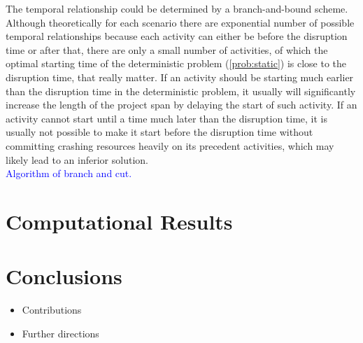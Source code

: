 \documentclass[11pt]{article}
\newcommand{\noi}{\noindent}
\begin{document}
	\noi The temporal relationship could be determined by a branch-and-bound scheme. Although theoretically for each scenario there are exponential number of possible temporal relationships because each activity can either be before the disruption time or after that, there are only a small number of activities, of which the optimal starting time of the deterministic problem (\ref{prob:static}) is close to the disruption time, that really matter. If an activity should be starting much earlier than the disruption time in the deterministic problem, it usually will significantly increase the length of the project span by delaying the start of such activity. If an activity cannot start until a time much later than the disruption time, it is usually not possible to make it start before the disruption time without committing crashing resources heavily on its precedent activities, which may likely lead to an inferior solution.\\
	\newline
	\textcolor{blue}{Algorithm of branch and cut.}
\section{Computational Results} \label{sec:results}

\section{Conclusions} \label{sec:conclusions}
	\begin{itemize}
		\item Contributions
		\item Further directions
	\end{itemize}



\end{document}
